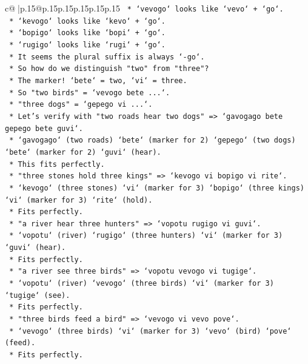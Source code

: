 \documentclass{article}
\begin{document}
{\begin{supertabular}{c@{$\;$}|p{.15\linewidth}@{}p{.15\linewidth}p{.15\linewidth}p{.15\linewidth}p{.15\linewidth}p{.15\linewidth}}
{{{\texttt{    *   `vevogo` looks like `vevo` + `go`.} \\
\texttt{    *   `kevogo` looks like `kevo` + `go`.} \\
\texttt{    *   `bopigo` looks like `bopi` + `go`.} \\
\texttt{    *   `rugigo` looks like `rugi` + `go`.} \\
\texttt{    *   It seems the plural suffix is always `{-}go`.} \\
\texttt{    *   So how do we distinguish "two" from "three"?} \\
\texttt{    *   The marker! `bete` = two, `vi` = three.} \\
\texttt{    *   So "two birds" = `vevogo bete ...`.} \\
\texttt{    *   "three dogs" = `gepego vi ...`.} \\
\texttt{    *   Let's verify with "two roads hear two dogs" => `gavogago bete gepego bete guvi`.} \\
\texttt{        *   `gavogago` (two roads) `bete` (marker for 2) `gepego` (two dogs) `bete` (marker for 2) `guvi` (hear).} \\
\texttt{        *   This fits perfectly.} \\
\texttt{    *   "three stones hold three kings" => `kevogo vi bopigo vi rite`.} \\
\texttt{        *   `kevogo` (three stones) `vi` (marker for 3) `bopigo` (three kings) `vi` (marker for 3) `rite` (hold).} \\
\texttt{        *   Fits perfectly.} \\
\texttt{    *   "a river hear three hunters" => `vopotu rugigo vi guvi`.} \\
\texttt{        *   `vopotu` (river) `rugigo` (three hunters) `vi` (marker for 3) `guvi` (hear).} \\
\texttt{        *   Fits perfectly.} \\
\texttt{    *   "a river see three birds" => `vopotu vevogo vi tugige`.} \\
\texttt{        *   `vopotu` (river) `vevogo` (three birds) `vi` (marker for 3) `tugige` (see).} \\
\texttt{        *   Fits perfectly.} \\
\texttt{    *   "three birds feed a bird" => `vevogo vi vevo pove`.} \\
\texttt{        *   `vevogo` (three birds) `vi` (marker for 3) `vevo` (bird) `pove` (feed).} \\
\texttt{        *   Fits perfectly.} \\
}}}
\end{supertabular}}
\end{document}
